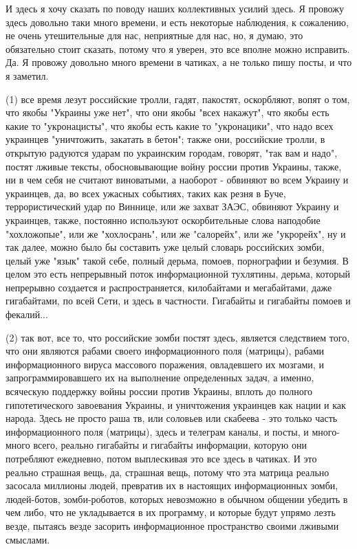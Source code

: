 И здесь я хочу сказать по поводу наших коллективных усилий здесь. Я провожу
здесь довольно таки много времени, и есть некоторые наблюдения, к сожалению, не
очень утешительные для нас, неприятные для нас, но, я думаю, это обязательно
стоит сказать, потому что я уверен, это все вполне можно исправить. Да. Я
провожу довольно много времени в чатиках, а не только пишу посты, и что я
заметил. 

(1) все время лезут российские тролли, гадят, пакостят, оскорбляют,
вопят о том, что якобы "Украины уже нет", что они якобы "всех накажут", что
якобы есть какие то "укронацисты", что якобы есть какие то "укронацики", что
надо всех украинцев "уничтожить, закатать в бетон"; также они, российские
тролли, в открытую радуются ударам по украинским городам, говорят, "так вам и
надо", постят лживые тексты, обосновывающие войну россии против Украины, также,
ни в чем себя не считают виноватыми, а наоборот - обвиняют во всем Украину и
украинцев, да, во всех ужасных событиях, таких как резня в Буче,
террористический удар по Виннице, или же захват ЗАЭС, обвиняют Украину и
украинцев, также, постоянно используют оскорбительные слова наподобие
"хохложопые", или же "хохлосрань", или же "салорейх", или же "укрорейх", ну и
так далее, можно было бы составить уже целый словарь российских зомби, целый
уже "язык" такой себе, полный дерьма, помоев, порнографии и безумия. В целом
это есть непрерывный поток информационной тухлятины, дерьма, который непрерывно
создается и распространяется, килобайтами и мегабайтами, даже гигабайтами, по
всей Сети, и здесь в частности. Гигабайты и гигабайты помоев и фекалий...  

(2) так вот, все то, что российские зомби постят здесь, является следствием
того, что они являются рабами своего информационного поля (матрицы), рабами
информационного вируса массового поражения, овладевшего их мозгами, и
запрограммировавшего их на выполнение определенных задач, а именно, всяческую
поддержку войны россии против Украины, вплоть до полного гипотетического
завоевания Украины, и уничтожения украинцев как нации и как народа. Здесь не
просто раша тв, или соловьев или скабеева - это только часть информационного
поля (матрицы), здесь и телеграм каналы, и посты, и много-много всего, реально
гигабайты и гигабайты информации, которую они потребляют ежедневно, потом
выплескивая это все здесь в чатиках.  И это реально страшная вещь, да, страшная
вещь, потому что эта матрица реально засосала миллионы людей, превратив их в
настоящих информационных зомби, людей-ботов, зомби-роботов, которых невозможно
в обычном общении убедить в чем либо, что не укладывается в их программу, и
которые будут упрямо лезть везде, пытаясь везде засорить информационное
пространство своими лживыми смыслами.

